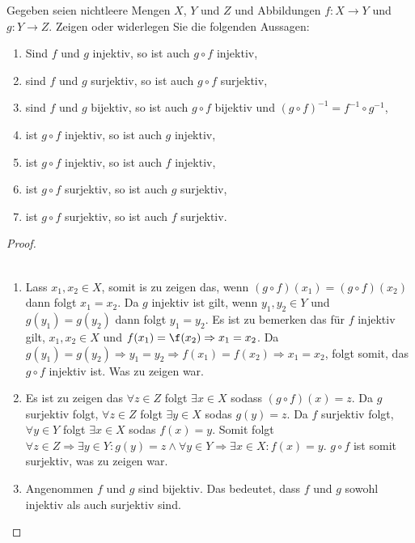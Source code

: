 \documentclass{../problemset}
\begin{document}
\maketitle
\begin{problem}
Gegeben seien nichtleere Mengen $X$, $Y$ und $Z$ und Abbildungen $f : X \rightarrow Y$ und $g : Y \rightarrow Z$.
Zeigen oder widerlegen Sie die folgenden Aussagen:
\begin{enumerate}
	\item Sind $f$ und $g$ injektiv, so ist auch $g \circ f$ injektiv,
	\item sind $f$ und $g$ surjektiv, so ist auch $g \circ f$ surjektiv,
	\item sind $f$ und $g$ bijektiv, so ist auch $g \circ f$ bijektiv und ${(g \circ f )}^{−1} = f^{-1} \circ g^{-1}$,
	\item ist $g \circ f$ injektiv, so ist auch $g$ injektiv,
	\item ist $g \circ f$ injektiv, so ist auch $f$ injektiv,
	\item ist $g \circ f$ surjektiv, so ist auch $g$ surjektiv,
	\item ist $g \circ f$ surjektiv, so ist auch $f$ surjektiv.
\end{enumerate}
\begin{proof} \\\
	\begin{enumerate}
		\item Lass $x_1,x_2 \in X$, somit is zu zeigen das, wenn $(g \circ f)(x_1) = (g \circ f)(x_2) $ dann folgt $x_1 = x_2$.
		      Da $g$ injektiv ist gilt, wenn $y_1, y_2 \in Y$ und $g(y_1) = g(y_2)$ dann folgt $y_1 = y_2$.
		      Es ist zu bemerken das für $f$ injektiv gilt, $x_1, x_2 \in X$ und $f(x_1) = \f(x_2) \Rightarrow x_1 = x_2$.
		      Da $g(y_1) = g(y_2) \Rightarrow y_1 = y_2 \Rightarrow f(x_1) = f(x_2) \Rightarrow x_1 = x_2$, folgt somit, das $g \circ f$ injektiv ist.
		      Was zu zeigen war. \checkmark
		\item Es ist zu zeigen das $\forall z \in Z$ folgt $\exists x \in X$ sodass $(g \circ f)(x) = z$.
		      Da $g$ surjektiv folgt, $\forall z \in Z$ folgt $\exists y \in X$ sodas $g(y) = z$.
		      Da $f$ surjektiv folgt, $\forall y \in Y$ folgt $\exists x \in X$ sodas $f(x) = y$.
		      Somit folgt $\forall z \in Z \Rightarrow \exists y \in Y: g(y) = z \land \forall y \in Y \Rightarrow \exists x \in X: f(x) = y$.
		      $g \circ f$ ist somit surjektiv, was zu zeigen war. \checkmark
		\item Angenommen $f$ und $g$ sind bijektiv. Das bedeutet, dass $f$ und $g$ sowohl injektiv als auch surjektiv sind.

\end{enumerate}
\end{proof}
\end{problem}
\end{document}

